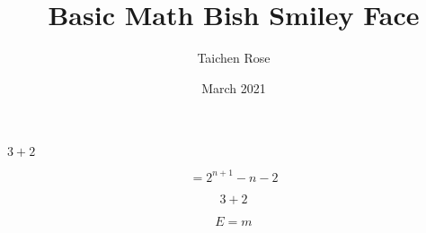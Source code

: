 \documentclass{article}
\title{Basic Math Bish Smiley Face}
\author{Taichen Rose}
\date{March 2021}
\begin{document}
$3 + 2$

$$= 2^{n + 1} - n - 2$$

\[3 + 2\]

\begin{equation}
E=m
\end{equation}
\end{document}
